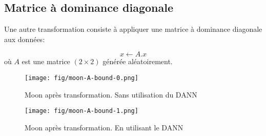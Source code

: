 \documentclass[]{article}
\begin{document}
\subsection{Matrice à dominance
diagonale}\label{matrice-uxe0-dominance-diagonale}

Une autre transformation consiste à appliquer une matrice à dominance
diagonale aux données:

\[ x \gets A.x \] où $A$ est une matrice $(2\times2)$ générée
aléatoirement.

\begin{figure*}[htbp]
\centering
\begin{subfigure}[htbp]{.45\textwidth}
\centering
\texttt{[image: fig/moon-A-bound-0.png]}
\caption{Moon après transformation. Sans utilisation du DANN}
\end{subfigure}
\begin{subfigure}[htbp]{.45\textwidth}
\centering
\texttt{[image: fig/moon-A-bound-1.png]}
\caption{Moon après transformation. En utilisant le DANN}
\end{subfigure}
\end{figure*}
\end{document}
